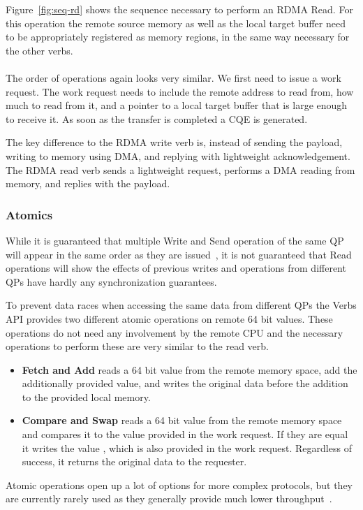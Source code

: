 Figure~\ref{fig:seq-rd} shows the sequence necessary to perform an RDMA Read. For this operation the remote source memory as
well as the local target buffer need to be appropriately registered as memory regions, in the same way necessary for the
other verbs.

\paragraph{} The order of operations again looks very similar. We first need to issue a work request. The work request needs 
to include the remote address to read from, how much to read from it, and a pointer to a local target buffer that is large
enough to receive it. As soon as the  transfer is completed a CQE is generated. 

The key difference to the RDMA write verb is, 
instead of sending the payload, writing to memory using DMA, and replying with lightweight acknowledgement. The 
RDMA read verb sends a lightweight request, performs a DMA reading from memory, and replies with the payload.

\pagebreak
\subsubsection{Atomics}

While it is guaranteed that multiple Write and Send operation of the same QP will appear in the same order as they are 
issued~\cite{rdma-reference}, it is not guaranteed that Read operations will show the effects of previous writes and operations from
different QPs have hardly any synchronization guarantees.

To prevent data races when accessing the same data from different QPs the Verbs API provides two different atomic operations 
on remote 64 bit values. These operations do not need any involvement by the remote CPU and the necessary operations 
to perform these are very similar to the read verb.


\begin{itemize}
  \item \textbf{Fetch and Add} reads a 64 bit value from the remote memory space, add the additionally provided 
     value, and writes the original data before the addition to the provided local memory.
  \item \textbf{Compare and Swap} reads a 64 bit value from the remote memory space and compares it to 
    the  value provided in the work request. If they are equal it writes the value ,
    which is also provided in the work request. Regardless of success, it returns the original data to the requester.
\end{itemize}

Atomic operations open up a lot of options for more complex protocols, but they are currently rarely used as they generally
provide much lower throughput~\cite{anuj-guide}.


